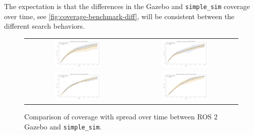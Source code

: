 The expectation is that the differences in the Gazebo and \texttt{simple\_sim} coverage over time, see \cref{fig:coverage-benchmark-diff}, will be consistent between the different search behaviors.


\begin{figure}[H]
  \centering
  \begin{tabular}{cc}
    \includegraphics[width=0.45\textwidth]{./figures/plots/consistency/gazebo_vs_simple_sim_roomba.png} &
    \includegraphics[width=0.45\textwidth]{./figures/plots/consistency/gazebo_vs_simple_sim_gradient.png} \\
    \includegraphics[width=0.45\textwidth]{./figures/plots/consistency/gazebo_vs_simple_sim_hybrid.png} &
    \includegraphics[width=0.45\textwidth]{./figures/plots/consistency/gazebo_vs_simple_sim_pure_pathing.png} \\
  \end{tabular}
  \caption{Comparison of coverage with spread over time between ROS 2 Gazebo and \texttt{simple\_sim}.}
  \label{fig:coverage-benchmark-all}
\end{figure}

